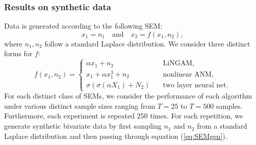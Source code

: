 \documentclass[]{article}
\begin{document}



\subsubsection*{Results on synthetic data}%
Data is  generated according to the following 
SEM:
\begin{equation}
x_1 = n_1 ~~~ \mbox{ and } ~~~ x_2 = f( x_1, n_2),\label{eq:SEMgen}
\end{equation}
where $n_1, n_2$ follow a standard Laplace distribution. 
We consider three distinct forms for $f$:
\begin{equation}
f(x_1, n_2) = \begin{cases}
\alpha x_1 + n_2       & \quad \text{LiNGAM, } \\
x_1 + \alpha x_1^3 + n_2  & \quad \text{nonlinear ANM, }\\
\sigma \left (  \sigma \left ( \alpha X_1 \right ) + N_2 \right ) &\quad \text{two layer neural net.}
\end{cases}
\end{equation}
For each distinct class of SEMs, we consider the performance of each algorithm under 
various distinct sample sizes ranging from $T=25$ to $T=500$ samples. 
Furthermore, each experiment is repeated 250 times. For each repetition, 
we generate synthetic bivariate data by first sampling $n_1$ and $n_2$
from a standard Laplace distribution and then passing through equation (\ref{eq:SEMgen}). 
\end{document}
